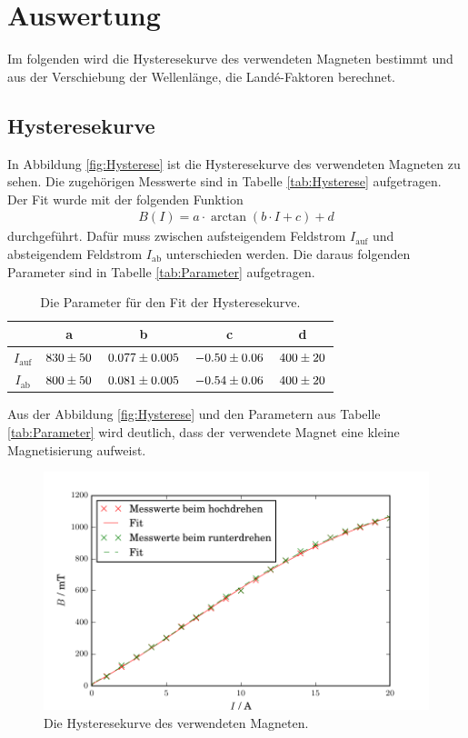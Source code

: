 \newpage
\section{Auswertung}
\label{sec:Auswertung}
Im folgenden wird die Hysteresekurve des verwendeten Magneten bestimmt und aus der Verschiebung der Wellenlänge, die Landé-Faktoren berechnet.

\subsection{Hysteresekurve}
In Abbildung \eqref{fig:Hysterese} ist die Hysteresekurve des verwendeten Magneten zu sehen. Die zugehörigen Messwerte sind in Tabelle \eqref{tab:Hysterese} aufgetragen. Der Fit wurde mit der folgenden Funktion
\begin{align*}
  B(I) = a\cdot \arctan(b\cdot I + c) + d
\end{align*}
durchgeführt. Dafür muss zwischen aufsteigendem Feldstrom $I_\text{auf}$ und absteigendem Feldstrom $I_\text{ab}$ unterschieden werden. Die daraus folgenden Parameter sind in Tabelle \eqref{tab:Parameter} aufgetragen.

\begin{table}[H] %
  \centering
  \caption{Die Parameter für den Fit der Hysteresekurve.}
  \label{tab:Parameter}
  \begin{tabular}{c|c|c|c|c}
    & a & b & c & d \\
    \hline
    $I_\text{auf}$ & $\num{830 +- 50}$ & $\num{0.077 +- 0.005}$ & $\num{-0.50 +- 0.06}$ & $\num{400 +- 20}$ \\
    $I_\text{ab}$ & $\num{800 +- 50}$ & $\num{0.081 +- 0.005}$ & $\num{-0.54 +- 0.06}$ & $\num{400 +- 20}$ \\
  \end{tabular}
\end{table}

Aus der Abbildung \eqref{fig:Hysterese} und den Parametern aus Tabelle \eqref{tab:Parameter} wird deutlich, dass der verwendete Magnet eine kleine Magnetisierung aufweist.

\begin{figure}[H] %
  \centering
  \includegraphics[width=1.3\linewidth, angle=90]{Bilder/Hysterese.pdf}
  \caption{Die Hysteresekurve des verwendeten Magneten.}
  \label{fig:Hysterese}
\end{figure}

